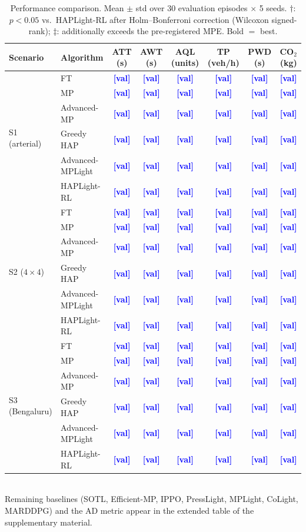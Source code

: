 \documentclass[journal]{IEEEtran}
\newcommand{\pl}{\textcolor{blue}{\textbf{[val]}}}
\begin{document}
\begin{table}[htbp]
\caption{Performance comparison. Mean $\pm$ std over 30 evaluation
episodes $\times$ 5 seeds. $\dagger$: $p<0.05$ vs.\ HAPLight-RL after
Holm--Bonferroni correction (Wilcoxon signed-rank);
$\ddagger$: additionally exceeds the pre-registered MPE. Bold $=$ best.}
\label{tab:main}
\centering
\footnotesize
\begin{tabular}{@{}llcccccc@{}}
\toprule
Scenario & Algorithm & ATT (s) & AWT (s) & AQL (units) & TP (veh/h) &
PWD (s) & CO$_2$ (kg) \\
\midrule
\multirow{6}{*}{S1 (arterial)}
 & FT               & \pl & \pl & \pl & \pl & \pl & \pl \\
 & MP               & \pl & \pl & \pl & \pl & \pl & \pl \\
 & Advanced-MP      & \pl & \pl & \pl & \pl & \pl & \pl \\
 & Greedy HAP       & \pl & \pl & \pl & \pl & \pl & \pl \\
 & Advanced-MPLight & \pl & \pl & \pl & \pl & \pl & \pl \\
 & HAPLight-RL      & \pl & \pl & \pl & \pl & \pl & \pl \\
\midrule
\multirow{6}{*}{S2 ($4\times4$)}
 & FT               & \pl & \pl & \pl & \pl & \pl & \pl \\
 & MP               & \pl & \pl & \pl & \pl & \pl & \pl \\
 & Advanced-MP      & \pl & \pl & \pl & \pl & \pl & \pl \\
 & Greedy HAP       & \pl & \pl & \pl & \pl & \pl & \pl \\
 & Advanced-MPLight & \pl & \pl & \pl & \pl & \pl & \pl \\
 & HAPLight-RL      & \pl & \pl & \pl & \pl & \pl & \pl \\
\midrule
\multirow{6}{*}{S3 (Bengaluru)}
 & FT               & \pl & \pl & \pl & \pl & \pl & \pl \\
 & MP               & \pl & \pl & \pl & \pl & \pl & \pl \\
 & Advanced-MP      & \pl & \pl & \pl & \pl & \pl & \pl \\
 & Greedy HAP       & \pl & \pl & \pl & \pl & \pl & \pl \\
 & Advanced-MPLight & \pl & \pl & \pl & \pl & \pl & \pl \\
 & HAPLight-RL      & \pl & \pl & \pl & \pl & \pl & \pl \\
\bottomrule
\end{tabular}
\\[2pt]
\footnotesize
Remaining baselines (SOTL, Efficient-MP, IPPO, PressLight, MPLight,
CoLight, MARDDPG) and the AD metric appear in the extended table of the
supplementary material.
\end{table}
\end{document}
